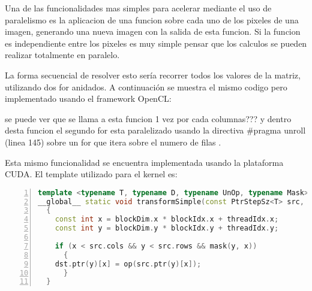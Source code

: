 \documentclass[a4paper,10pt]{report}
\begin{document}

Una de las funcionalidades mas simples para acelerar mediante el uso de paralelismo es la aplicacion de una funcion sobre cada uno de los pixeles de una imagen, generando una nueva imagen con la salida de esta funcion.
Si la funcion es independiente entre los pixeles es muy simple pensar que los calculos se pueden realizar totalmente en paralelo.

La forma secuencial de resolver esto sería recorrer todos los valores de la matriz, utilizando dos for anidados.
A continuación se muestra el mismo codigo pero implementado usando el framework OpenCL:


 se puede ver que se llama a esta funcion 1 vez por cada columnas??? y dentro desta funcion el segundo for esta paralelizado usando la directiva \#pragma unroll (linea 145) sobre un for que itera sobre el numero de filas .

Esta mismo funcionalidad se encuentra implementada usando la plataforma CUDA.
El template utilizado para el kernel es:


\begin{lstlisting}[frame=bt,caption={gpu/include/opencv2/gpu/device/detail/transform\_detail.hpp},
columns=fullflexible,numbers=left,backgroundcolor=\color{LemonChiffon1},basicstyle=\footnotesize,keywordstyle=\ttfamily\footnotesize,language=C++,stringstyle=\ttfamily,breaklines=true,xleftmargin=0.5em,xrightmargin=0pt,aboveskip=\bigskipamount,belowskip=\bigskipamount]
template <typename T, typename D, typename UnOp, typename Mask>
__global__ static void transformSimple(const PtrStepSz<T> src, PtrStep<D> dst, const Mask mask, const UnOp op)
  {
    const int x = blockDim.x * blockIdx.x + threadIdx.x;
    const int y = blockDim.y * blockIdx.y + threadIdx.y;

    if (x < src.cols && y < src.rows && mask(y, x))
      {
	dst.ptr(y)[x] = op(src.ptr(y)[x]);
      }
  }

\end{lstlisting}
\end{document}
